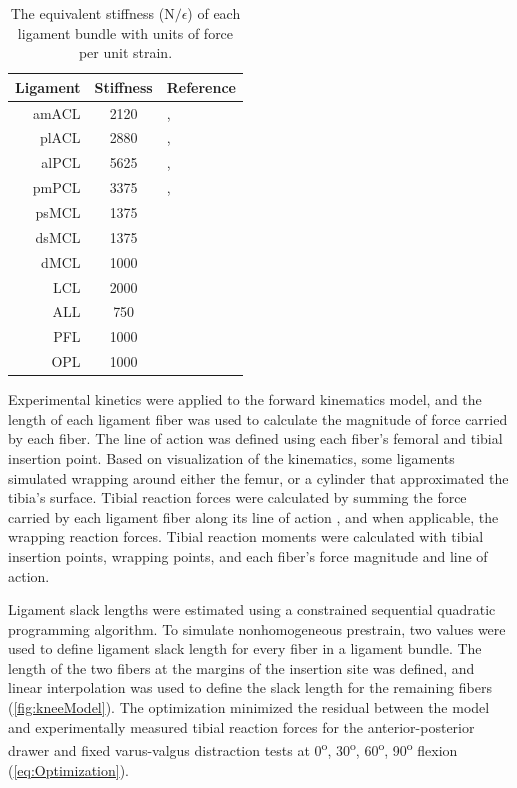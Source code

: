 \begin{table}
    \caption{The equivalent stiffness (N$/\epsilon$) of each ligament bundle with units of force per unit strain.}
    \label{tab:equivalentStiffness}
    \begin{tabular}{ r c p{9em}} \hline
        \textbf{Ligament} & \textbf{Stiffness} & \textbf{Reference} \\ \hline
        amACL & 2120 & \cite{amiri_mechanics_2007}, \cite{kia_multibody_2016} \\
        plACL & 2880 & \cite{amiri_mechanics_2007}, \cite{kia_multibody_2016} \\
        alPCL & 5625 & \cite{amiri_mechanics_2007}, \cite{kia_multibody_2016} \\
        pmPCL & 3375 & \cite{amiri_mechanics_2007}, \cite{kia_multibody_2016} \\
        psMCL & 1375 & \cite{amiri_mechanics_2007} \\
        dsMCL & 1375 & \cite{amiri_mechanics_2007} \\
        dMCL & 1000 & \cite{amiri_mechanics_2007} \\
        LCL & 2000 & \cite{amiri_mechanics_2007} \\
        ALL & 750 & \cite{ewing_estimating_2015} \\
        PFL & 1000 & \cite{ewing_estimating_2015} \\
        OPL & 1000 & \cite{ewing_estimating_2015} \\
        \hline
    \end{tabular}
\end{table}

Experimental kinetics were applied to the forward kinematics model, and the length of each ligament fiber was used to calculate the magnitude of force carried by each fiber. The line of action was defined using each fiber's femoral and tibial insertion point. Based on visualization of the kinematics, some ligaments simulated wrapping around either the femur, or a cylinder that approximated the tibia's surface. Tibial reaction forces were calculated by summing the force carried by each ligament fiber along its line of action \citep{mommersteeg_characterization_1996}, and when applicable, the wrapping reaction forces. Tibial reaction moments were calculated with tibial insertion points, wrapping points, and each fiber's force magnitude and line of action.

Ligament slack lengths were estimated using a constrained sequential quadratic programming algorithm. To simulate nonhomogeneous prestrain, two values were used to define ligament slack length for every fiber in a ligament bundle. The length of the two fibers at the margins of the insertion site was defined, and linear interpolation was used to define the slack length for the remaining fibers (\autoref{fig:kneeModel}). The optimization minimized the residual between the model and experimentally measured tibial reaction forces for the anterior-posterior drawer and fixed varus-valgus distraction tests at 0\textsuperscript{o}, 30\textsuperscript{o}, 60\textsuperscript{o}, 90\textsuperscript{o} flexion (\autoref{eq:Optimization}).

